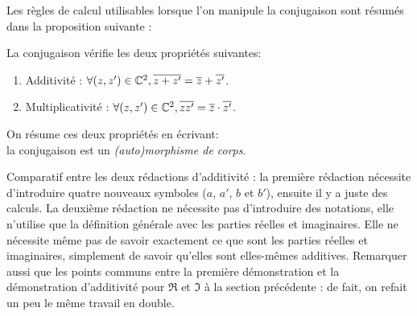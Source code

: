 Les règles de calcul utilisables lorsque l'on manipule la conjugaison sont résumés dans la proposition suivante : 

\begin{proposition}
La conjugaison vérifie les deux propriétés suivantes:
\begin{enumerate}
\item Additivité :  $\forall (z, z')\in \mathbb{C}^2, \overline{z+z'} = \overline{z}+\overline{z'}$. 
\item Multiplicativité :  $\forall (z,z')\in\mathbb{C}^2, \overline{zz'} = \overline{z}\cdot\overline{z'}$.
\end{enumerate}
On résume ces deux propriétés en écrivant:\\
\og la conjugaison est un \emph{(auto)morphisme de corps}.\fg{}
% 
\end{proposition}

\begin{remarque}
Comparatif entre les deux rédactions d'additivité : la première rédaction nécessite d'introduire quatre nouveaux symboles ($a$, $a'$, $b$ et $b'$), ensuite il y a juste des calculs. La deuxième rédaction ne nécessite pas d'introduire des notations, elle n'utilise que la définition générale avec les parties réelles et imaginaires. Elle ne nécessite même pas de savoir exactement ce que sont les parties réelles et imaginaires, simplement de savoir qu'elles sont elles-mêmes additives. Remarquer aussi que les points communs entre la première démonstration et la démonstration d'additivité pour $\Re$ et $\Im$ à la section précédente : de fait, on refait un peu le même travail en double.
\end{remarque}

